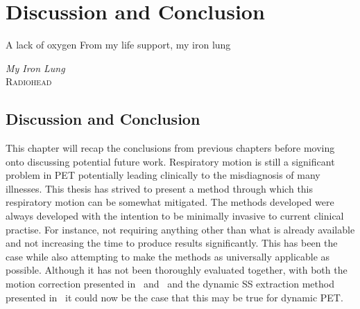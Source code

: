 \chapter{Discussion and Conclusion} \label{sec:discussion_and_conclusion}
    \vspace*{\fill}
    \setlength{\epigraphwidth}{0.4\linewidth}
    \renewcommand{\epigraphflush}{flushright}
    \renewcommand{\epigraphsize}{\footnotesize}
    \epigraph{A lack of oxygen\newline
              From my life support, my iron lung}%
              {\textit{My Iron Lung}\\ \textsc{Radiohead}}
    
    \newpage

    \section{Discussion and Conclusion} \label{sec:discussion_and_conclusion_discussion_and_conclusion}
        This chapter will recap the conclusions from previous chapters before moving onto discussing potential future work. Respiratory motion is still a significant problem in \gls{PET} potentially leading clinically to the misdiagnosis of many illnesses. This thesis has strived to present a method through which this respiratory motion can be somewhat mitigated. The methods developed were always developed with the intention to be minimally invasive to current clinical practise. For instance, not requiring anything other than what is already available and not increasing the time to produce results significantly. This has been the case while also attempting to make the methods as universally applicable as possible. Although it has not been thoroughly evaluated together, with both the motion correction presented in~ and~ and the dynamic \gls{SS} extraction method presented in~ it could now be the case that this may be true for dynamic \gls{PET}.

